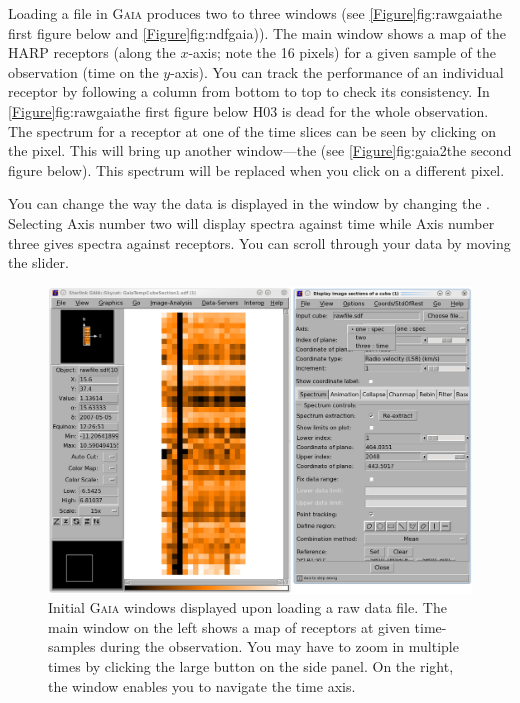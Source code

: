 \documentclass[11pt,oneside,chapters]{starlink}
\begin{document}
\begin{terminalv}
\end{terminalv}

Loading a file in \textsc{Gaia} produces two to three windows (see
\cref{Figure}{fig:rawgaia}{the first figure below} and
\cref{Figure}{fig:ndfgaia})). The main window
shows a map of the HARP receptors (along the $x$-axis; note the 16
pixels) for a given sample of the observation (time on the $y$-axis).
You can track the performance of an individual receptor by following a
column from bottom to top to check its consistency. In
\cref{Figure}{fig:rawgaia}{the first figure below} H03 is dead for the
whole observation. The spectrum for a receptor at one of the time
slices can be seen by clicking on the pixel. This will bring up
another window---the  (see
\cref{Figure}{fig:gaia2}{the second figure below}). This spectrum will
be replaced when you click on a different pixel.

You can change the way the data is displayed in the  window by changing the .
Selecting Axis number two will display spectra against time while Axis
number three gives spectra against receptors. You can scroll through
your data by moving the  slider.

\begin{figure}[h!]
\begin{center}
\includegraphics[width=0.9\linewidth]{sc20_gaia1}
\caption[\gaia\ main window.]{\label{fig:rawgaia}
  Initial \textsc{Gaia} windows displayed upon loading a raw
  data file. The main window on the left shows a map of receptors at
  given time-samples during the observation. You may have to zoom in
  multiple times by clicking the large  button on the side
  panel. On the right, the 
  window enables you to navigate the time axis.}
\end{center}
\end{figure}
\end{document}
